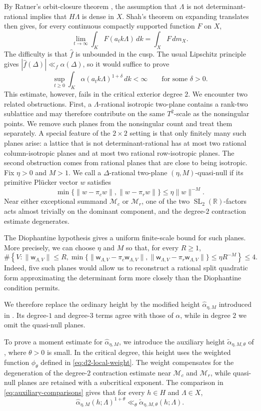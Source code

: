 \documentclass[reqno,11pt]{amsart}
\theoremstyle{definition}
\theoremstyle{remark}
\numberwithin{equation}{section}
\newcommand{\SL}{\operatorname{SL}}
\begin{document}
By Ratner's orbit-closure theorem \cite{ratner:1991}, the assumption that
$\Lambda$ is not determinant-rational implies that $H\Lambda$ is dense in
$X$. Shah's theorem on expanding translates \cite{shah} then gives, for
every  continuous compactly supported function $F$ on $X$,
$$
\lim_{t\to\infty}\int_KF(a_tk\Lambda)\,dk
=
\int_XF\,dm_X.
$$
The difficulty is that $\widehat f$ is unbounded in the cusp. The usual
Lipschitz principle gives
$|\widehat f(\Delta)|\ll_f\alpha(\Delta)$, so it would suffice to prove
$$
\sup_{t\ge0}
\int_K\alpha(a_tk\Lambda)^{1+\delta}\,dk
<\infty
\qquad\text{for some $\delta>0$}.
$$
This estimate, however, fails in the critical exterior degree $2$.
We encounter two related obstructions. First, a $\Lambda$-rational
isotropic two-plane contains a rank-two sublattice and may therefore
contribute on the same $T^2$-scale as the nonsingular points. We remove
such planes from the nonsingular count and treat them separately. A
special feature of the $2\times2$ setting is that only finitely many such
planes arise: a lattice that is not determinant-rational has at most two
rational column-isotropic planes and at most two rational row-isotropic
planes.
The second obstruction comes from rational planes that are close to being
isotropic. Fix $\eta>0$ and $M>1$. We call a $\Delta$-rational two-plane
$(\eta,M)$-quasi-null if its primitive Pl\"ucker vector $w$ satisfies
$$
\min\{\|w-\pi_cw\|,\|w-\pi_rw\|\}
\le
\eta\|w\|^{-M}.
$$
Near either exceptional summand $\mathcal M_c$ or $\mathcal M_r$, one of
the two $\SL_2(\mathbb R)$-factors acts almost trivially on the dominant
component, and the degree-$2$ contraction estimate degenerates.

The Diophantine hypothesis gives a uniform finite-scale bound for such
planes. More precisely, we can choose $\eta$ and $M$ so that, for every
$R\ge1$,
$$
\#\left\{
V:
\|\mathsf w_{\Lambda,V}\|\le R,\min\{\|\mathsf w_{\Lambda,V}-\pi_c\mathsf w_{\Lambda,V}\|,
      \|\mathsf w_{\Lambda,V}-\pi_r\mathsf w_{\Lambda,V}\|\}
\le\eta R^{-M}\right\}
\le4.
$$
Indeed, five such planes would allow us to reconstruct a rational split
quadratic form approximating the determinant form more closely than the
Diophantine condition permits.

We therefore replace the ordinary height by the modified height
$\widehat\alpha_{\eta,M}$ introduced in
.  Its degree-$1$ and degree-$3$ terms agree
with those of $\alpha$, while in degree $2$ we omit the quasi-null
planes.


To prove a moment estimate for $\widehat\alpha_{\eta,M}$, we introduce the
auxiliary height $\widetilde\alpha_{\eta,M,\theta}$ of
, where $\theta>0$ is small. In the critical
degree, this height uses the weighted function $\phi_\theta$ defined in
\eqref{eq:d2-local-weight}. The weight compensates for the degeneration of
the degree-$2$ contraction estimate near $\mathcal M_c$ and
$\mathcal M_r$, while quasi-null planes are retained with a subcritical
exponent. The comparison in \eqref{eq:auxiliary-comparisons} gives that for every $h\in H$
and $\Lambda\in X$,
$$
\widehat\alpha_{\eta,M}(h;\Lambda)^{1+\theta}
\ll_\theta
\widetilde\alpha_{\eta,M,\theta}(h;\Lambda).
$$
\end{document}
